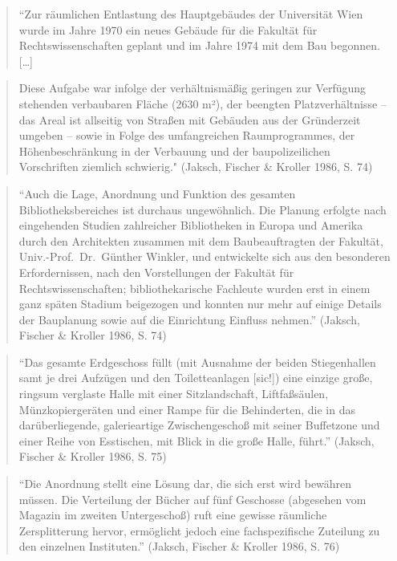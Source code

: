 \documentclass[a4paper,
fontsize=11pt,
oneside,
numbers=noperiodatend,
parskip=half-,
bibliography=totoc,
final
]{scrartcl}
\begin{document}
\begin{quote}
``Zur räumlichen Entlastung des Hauptgebäudes der Universität Wien wurde
im Jahre 1970 ein neues Gebäude für die Fakultät für
Rechtswissenschaften geplant und im Jahre 1974 mit dem Bau begonnen.
{[}\ldots{}{]}
\end{quote}

\begin{quote}
Diese Aufgabe war infolge der verhältnismäßig geringen zur Verfügung
stehenden verbaubaren Fläche (2630 m²), der beengten Platzverhältnisse --
das Areal ist allseitig von Straßen mit Gebäuden aus der Gründerzeit
umgeben -- sowie in Folge des umfangreichen Raumprogrammes, der
Höhenbeschränkung in der Verbauung und der baupolizeilichen Vorschriften
ziemlich schwierig." (Jaksch, Fischer \& Kroller 1986, S. 74)
\end{quote}

\begin{quote}
\enquote{Auch die Lage, Anordnung und Funktion des gesamten
Bibliotheksbereiches ist durchaus ungewöhnlich. Die Planung erfolgte
nach eingehenden Studien zahlreicher Bibliotheken in Europa und Amerika
durch den Architekten zusammen mit dem Baubeauftragten der Fakultät,
Univ.-Prof.~Dr.~Günther Winkler, und entwickelte sich aus den besonderen
Erfordernissen, nach den Vorstellungen der Fakultät für
Rechtswissenschaften; bibliothekarische Fachleute wurden erst in einem
ganz späten Stadium beigezogen und konnten nur mehr auf einige Details
der Bauplanung sowie auf die Einrichtung Einfluss nehmen.} (Jaksch,
Fischer \& Kroller 1986, S. 74)
\end{quote}

\begin{quote}
\enquote{Das gesamte Erdgeschoss füllt (mit Ausnahme der beiden
Stiegenhallen samt je drei Aufzügen und den Toiletteanlagen {[}sic!{]})
eine einzige große, ringsum verglaste Halle mit einer Sitzlandschaft,
Liftfaßsäulen, Münzkopiergeräten und einer Rampe für die Behinderten,
die in das darüberliegende, galerieartige Zwischengeschoß mit seiner
Buffetzone und einer Reihe von Esstischen, mit Blick in die große Halle,
führt.} (Jaksch, Fischer \& Kroller 1986, S. 75)
\end{quote}

\begin{quote}
\enquote{Die Anordnung stellt eine Lösung dar, die sich erst wird
bewähren müssen. Die Verteilung der Bücher auf fünf Geschosse (abgesehen
vom Magazin im zweiten Untergeschoß) ruft eine gewisse räumliche
Zersplitterung hervor, ermöglicht jedoch eine fachspezifische Zuteilung
zu den einzelnen Instituten.} (Jaksch, Fischer \& Kroller 1986, S. 76)
\end{quote}
\end{document}
